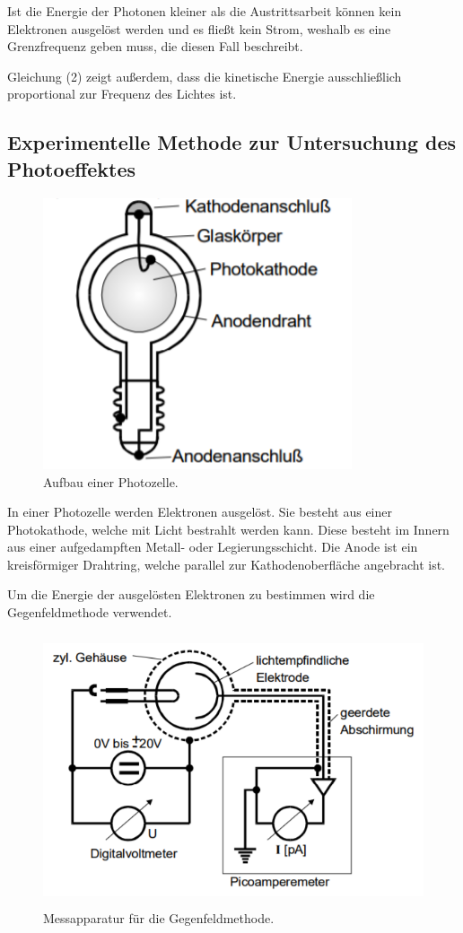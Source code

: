 Ist die Energie der Photonen kleiner als die Austrittsarbeit können kein Elektronen ausgelöst werden und
es fließt kein Strom, weshalb es eine Grenzfrequenz geben muss, die diesen Fall beschreibt.

Gleichung (2) zeigt außerdem, dass die kinetische Energie ausschließlich proportional zur Frequenz des Lichtes ist.

\subsection{Experimentelle Methode zur Untersuchung des Photoeffektes}

\begin{figure}[H]
  \centering
  \includegraphics[height=8cm]{photozelle.PNG}
  \caption{Aufbau einer Photozelle. \cite{sample}}
  \label{fig:kathode}
\end{figure}

In einer Photozelle werden Elektronen ausgelöst. Sie besteht aus einer Photokathode, welche mit Licht bestrahlt werden kann.
Diese besteht im Innern aus einer aufgedampften Metall- oder Legierungsschicht.
Die Anode ist ein kreisförmiger Drahtring, welche parallel zur Kathodenoberfläche angebracht ist.

Um die Energie der ausgelösten Elektronen zu bestimmen wird die Gegenfeldmethode verwendet.


\begin{figure}[H]
  \centering
  \includegraphics[height=8cm]{gegenfeld.PNG}
  \caption{Messapparatur für die Gegenfeldmethode. \cite{sample}}
  \label{fig:kathode}
\end{figure}

